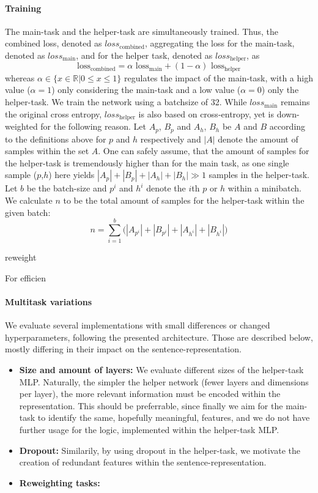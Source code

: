 \paragraph*{Training}
The main-task and the helper-task are simultaneously trained. Thus, the combined loss, denoted as $loss_\text{combined}$, aggregating the loss for the main-task, denoted as $loss_\text{main}$, and for the helper task, denoted as $loss_\text{helper}$, as
\begin{equation}
\label{eq:multitask_aggregate}
\text{loss}_\text{combined} = \alpha \text{ loss}_\text{main} + (1 - \alpha)\text{ loss}_\text{helper}
\end{equation}
whereas $\alpha \in \{x \in \mathbb{R} | 0 \leq x \leq 1\}$ regulates the impact of the main-task, with a high value ($\alpha = 1$) only considering the main-task and a low value ($\alpha = 0$) only the helper-task. We train the network using a batchsize of 32. While $loss_\text{main}$ remains the original cross entropy, $loss_\text{helper}$ is also based on cross-entropy, yet is down-weighted for the following reason. Let $A_p$, $B_p$ and $A_h$, $B_h$ be $A$ and $B$ according to the definitions above for $p$ and $h$ respectively and $|A|$ denote the amount of samples within the set $A$. One can safely assume, that the amount of samples for the helper-task is tremendously higher than for the main task, as one single sample ($p$,$h$) here yields $|A_p|+|B_p|+|A_h|+|B_h| \gg 1$ samples in the helper-task. Let $b$ be the batch-size and $p^i$ and $h^i$ denote the $i$th $p$ or $h$ within a minibatch. We calculate $n$ to be the total amount of samples for the helper-task within the given batch:
\begin{equation}
n = \sum^b_{i=1}\Big(|A_{p^i}|+|B_{p^i}|+|A_{h^i}|+|B_{h^i}|\Big)
\end{equation}


reweight

For efficien

\paragraph*{Multitask variations}
We evaluate several implementations with small differences or changed hyperparameters, following the presented architecture. Those are described below, mostly differing in their impact on the sentence-representation. 
\begin{itemize}
\item \textbf{Size and amount of layers:} We evaluate different sizes of the helper-task \ac{MLP}. Naturally, the simpler the helper network (fewer layers and dimensions per layer), the more relevant information must be encoded within the representation. This should be preferrable, since finally we aim for the main-task to identify the same, hopefully meaningful, features, and we do not have further usage for the logic, implemented within the helper-task \ac{MLP}.
\item  \textbf{Dropout:} Similarily, by using dropout in the helper-task, we motivate the creation of redundant features within the sentence-representation.
\item \textbf{Reweighting tasks:} 
\end{itemize}
